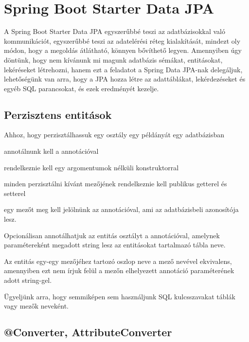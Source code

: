 \section{Spring Boot Starter Data JPA}

A Spring Boot Starter Data JPA egyszerűbbé teszi az adatbázisokkal való kommunikációt, egyszerűbbé teszi az adatelérési réteg kialakítását, mindezt oly módon, hogy a megoldás átlátható, könnyen bővíthető legyen. Amennyiben úgy döntünk, hogy nem kívánunk mi magunk adatbázis sémákat, entitásokat, lekéréseket létrehozni, hanem ezt a feladatot a Spring Data JPA-nak delegáljuk, lehetőségünk van arra, hogy a JPA hozza létre az adattáblákat, lekérdezéseket és egyéb SQL parancsokat, és ezek eredményét kezelje.

\subsection{Perzisztens entitások}

Ahhoz, hogy perzisztálhassuk egy osztály egy példányát egy adatbázisban 

\begin{listing}
	\item annotálnunk kell a  annotációval
	\item rendelkeznie kell egy argomentumok nélküli konstruktorral
	\item minden perzisztálni kívánt mezőjének rendelkeznie kell publikus getterel és setterel
	\item egy mezőt meg kell jelölnünk az  annotációval, ami az adatbázisbeli azonosítója lesz.
\end{listing}

Opcionálisan annotálhatjuk az entitás osztályt a  annotációval, amelynek  paramétereként megadott string lesz az entitásokat tartalmazó tábla neve. \par

Az entitás egy-egy mezőjéhez tartozó oszlop neve a mező nevével ekvivalens, amennyiben ezt nem írjuk felül a mezőn elhelyezett  annotáció  paraméterének adott string-gel. \par

Ügyeljünk arra, hogy semmiképen sem használjunk SQL kulcsszavakat táblák vagy mezők neveként.

\subsection{@Converter, AttributeConverter}

